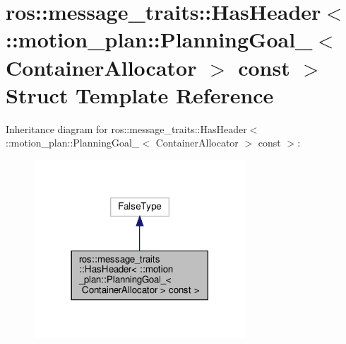 \hypertarget{structros_1_1message__traits_1_1HasHeader_3_01_1_1motion__plan_1_1PlanningGoal___3_01ContainerAllocator_01_4_01const_01_4}{}\section{ros\+:\+:message\+\_\+traits\+:\+:Has\+Header$<$ \+:\+:motion\+\_\+plan\+:\+:Planning\+Goal\+\_\+$<$ Container\+Allocator $>$ const $>$ Struct Template Reference}
\label{structros_1_1message__traits_1_1HasHeader_3_01_1_1motion__plan_1_1PlanningGoal___3_01ContainerAllocator_01_4_01const_01_4}


Inheritance diagram for ros\+:\+:message\+\_\+traits\+:\+:Has\+Header$<$ \+:\+:motion\+\_\+plan\+:\+:Planning\+Goal\+\_\+$<$ Container\+Allocator $>$ const $>$\+:
\nopagebreak
\begin{figure}[H]
\begin{center}
\leavevmode
\includegraphics[width=225pt]{structros_1_1message__traits_1_1HasHeader_3_01_1_1motion__plan_1_1PlanningGoal___3_01ContainerAl639e02c7ef6b49af8720e81c6026c9be}
\end{center}
\end{figure}


